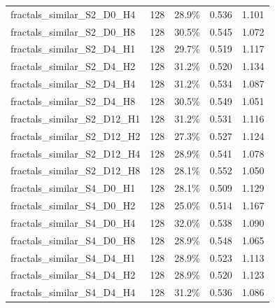 \documentclass[11pt]{article}
\begin{document}
\begin{longtable}{p{}rrrr}
fractals\_\allowbreak{}similar\_\allowbreak{}S2\_\allowbreak{}D0\_\allowbreak{}H4 & 128 & 28.9\% & 0.536 & 1.101\\
fractals\_\allowbreak{}similar\_\allowbreak{}S2\_\allowbreak{}D0\_\allowbreak{}H8 & 128 & 30.5\% & 0.545 & 1.072\\
fractals\_\allowbreak{}similar\_\allowbreak{}S2\_\allowbreak{}D4\_\allowbreak{}H1 & 128 & 29.7\% & 0.519 & 1.117\\
fractals\_\allowbreak{}similar\_\allowbreak{}S2\_\allowbreak{}D4\_\allowbreak{}H2 & 128 & 31.2\% & 0.520 & 1.134\\
fractals\_\allowbreak{}similar\_\allowbreak{}S2\_\allowbreak{}D4\_\allowbreak{}H4 & 128 & 31.2\% & 0.534 & 1.087\\
fractals\_\allowbreak{}similar\_\allowbreak{}S2\_\allowbreak{}D4\_\allowbreak{}H8 & 128 & 30.5\% & 0.549 & 1.051\\
fractals\_\allowbreak{}similar\_\allowbreak{}S2\_\allowbreak{}D12\_\allowbreak{}H1 & 128 & 31.2\% & 0.531 & 1.116\\
fractals\_\allowbreak{}similar\_\allowbreak{}S2\_\allowbreak{}D12\_\allowbreak{}H2 & 128 & 27.3\% & 0.527 & 1.124\\
fractals\_\allowbreak{}similar\_\allowbreak{}S2\_\allowbreak{}D12\_\allowbreak{}H4 & 128 & 28.9\% & 0.541 & 1.078\\
fractals\_\allowbreak{}similar\_\allowbreak{}S2\_\allowbreak{}D12\_\allowbreak{}H8 & 128 & 28.1\% & 0.552 & 1.050\\
fractals\_\allowbreak{}similar\_\allowbreak{}S4\_\allowbreak{}D0\_\allowbreak{}H1 & 128 & 28.1\% & 0.509 & 1.129\\
fractals\_\allowbreak{}similar\_\allowbreak{}S4\_\allowbreak{}D0\_\allowbreak{}H2 & 128 & 25.0\% & 0.514 & 1.167\\
fractals\_\allowbreak{}similar\_\allowbreak{}S4\_\allowbreak{}D0\_\allowbreak{}H4 & 128 & 32.0\% & 0.538 & 1.090\\
fractals\_\allowbreak{}similar\_\allowbreak{}S4\_\allowbreak{}D0\_\allowbreak{}H8 & 128 & 28.9\% & 0.548 & 1.065\\
fractals\_\allowbreak{}similar\_\allowbreak{}S4\_\allowbreak{}D4\_\allowbreak{}H1 & 128 & 28.9\% & 0.523 & 1.113\\
fractals\_\allowbreak{}similar\_\allowbreak{}S4\_\allowbreak{}D4\_\allowbreak{}H2 & 128 & 28.9\% & 0.520 & 1.123\\
fractals\_\allowbreak{}similar\_\allowbreak{}S4\_\allowbreak{}D4\_\allowbreak{}H4 & 128 & 31.2\% & 0.536 & 1.086\\

\end{longtable}
\end{document}
